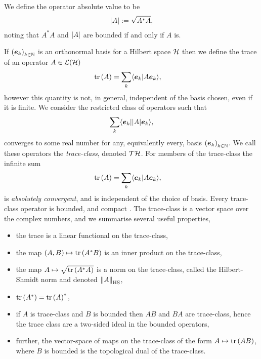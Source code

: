 We define the operator absolute value to be
\begin{align}
  {\left\lvert{A}\right\rvert} := \sqrt{A^*A},
\end{align}
noting that $A^*A$ and ${\left\lvert{A}\right\rvert}$ are bounded if and only if $A$ is.

If $\seq{\boe_k}[k\in\N]$ is an orthonormal basis for a Hilbert space $\mathcal{H}$ then we define the trace of an operator $A\in\bops[\hcal]$ 
\begin{align}
  \operatorname{tr}\left( A \right) &= \sum_k \langle \bm{e}_k|A\bm{e}_k\rangle,
\end{align}
however this quantity is not, in general, independent of the basis chosen, even if it is finite. We consider the restricted class of operators such that
\begin{align}
  \sum_k \langle \bm{e}_k|{\left\lvert{A}\right\rvert}\bm{e}_k\rangle,
\end{align}
converges to some real number for any, equivalently every, basis $\seq{\boe_k}[k\in\N]$. We call these operators the \emph{trace-class}, denoted $\trops{\hcal}$. For members of the trace-class the infinite sum
\begin{align}
  \operatorname{tr}\left( A \right) &= \sum_k \langle \bm{e}_k|A\bm{e}_k\rangle,
\end{align}
is \emph{absolutely convergent}, and is independent of the choice of basis. Every trace-class operator is bounded, and compact . The trace-class is a vector space over the complex numbers, and we summarise several useful properties,
\begin{itemize}
  \item the trace is a linear functional on the trace-class,
  \item the map $(A, B)\mapsto \operatorname{tr}\left( A^*B \right)$ is an inner product on the trace-class,
  \item the map $A\mapsto \sqrt{\operatorname{tr}\left( A^*A \right)}$ is a norm on the trace-class, called the Hilbert-Shmidt norm and denoted ${\left\lVert{A}\right\rVert}_{\text{HS}}$,
  \item $\operatorname{tr}\left( A^* \right) = \operatorname{tr}\left( A \right)^*$,
  \item if $A$ is trace-class and $B$ is bounded then $AB$ and $BA$ are trace-class, hence the trace class are a two-sided ideal in the bounded operators,
  \item further, the vector-space of maps on the trace-class of the form $A\mapsto\operatorname{tr}\left( AB \right)$, where $B$ is bounded is the topological dual of the trace-class.
\end{itemize}

